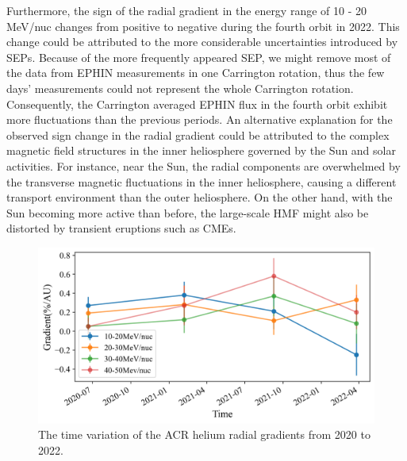 Furthermore, the sign of the radial gradient in the energy range of 10 - 20 MeV/nuc changes from positive to negative during the fourth orbit in 2022. This change could be attributed to the more considerable uncertainties introduced by \acp{SEP}. Because of the more frequently appeared \ac{SEP}, we might remove most of the data from \ac{EPHIN} measurements in one Carrington rotation, thus the few days' measurements could not represent the whole Carrington rotation. Consequently, the Carrington averaged \ac{EPHIN} flux in the fourth orbit exhibit more fluctuations than the previous periods. 
An alternative explanation for the observed sign change in the radial gradient could be attributed to the complex magnetic field structures in the inner heliosphere governed by the Sun and solar activities. 
For instance, near the Sun, the radial components are overwhelmed by the transverse magnetic fluctuations \citep{Rankin2022ApJ} in the inner heliosphere, causing a different transport environment than the outer heliosphere. 
On the other hand, with the Sun becoming more active than before, the large-scale \ac{HMF} might also be distorted by transient eruptions such as \acp{CME}.


\begin{figure}[!htb]
    \centering
    \includegraphics[width = \textwidth, height = 0.3\textheight]{images/ACR/timevariation_normalmask_gradient.png}
    \caption[The time variation of the \ac{ACR} helium radial gradients]{The time variation of the \ac{ACR} helium radial gradients from 2020 to 2022. }
    \label{fig:radialgradient_time_variation}
\end{figure}



